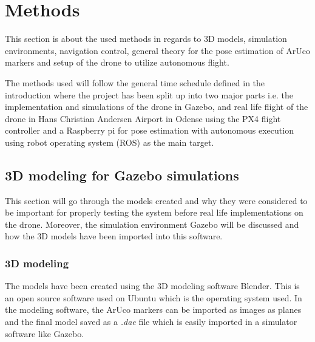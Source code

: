 \documentclass[../Head/report.tex]{subfiles}
\begin{document}


\lstset{style=mystyle}

\section{Methods}
\label{sec:methods}

This section is about the used methods in regards to 3D models, simulation environments, navigation control, general theory for the pose estimation of ArUco markers and setup of the drone to utilize autonomous flight.

The methods used will follow the general time schedule defined in the introduction where the project has been split up into two major parts i.e. the implementation and simulations of the drone in Gazebo, and real life flight of the drone in Hans Christian Andersen Airport in Odense using the PX4 flight controller and a Raspberry pi for pose estimation with autonomous execution using robot operating system (ROS) as the main target.

\subsection{3D modeling for Gazebo simulations}

This section will go through the models created and why they were considered to be important for properly testing the system before real life implementations on the drone. Moreover, the simulation environment Gazebo will be discussed and how the 3D models have been imported into this software.     

\label{sec:3d_modeling_for_gazebo_simulations}
\subsubsection{3D modeling}
The models have been created using the 3D modeling software Blender. This is an open source software used on Ubuntu which is the operating system used. In the modeling software, the ArUco markers can be imported as images as planes and the final model saved as a \textit{.dae} file which is easily imported in a simulator software like Gazebo.    
\end{document}
